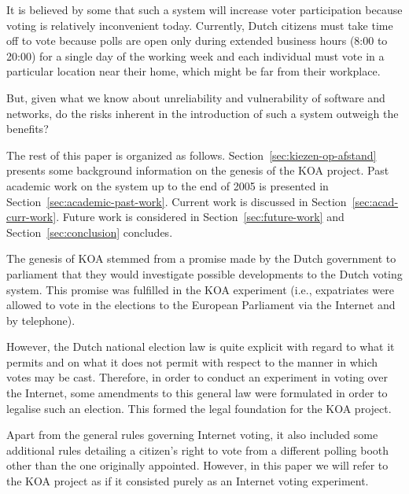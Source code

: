 \documentclass[times, 10pt, twocolumn]{article}
\newcommand{\NL}{the Netherlands\xspace}
\begin{document}
It is believed by some that such a system will increase voter participation 
because voting is relatively inconvenient today. Currently, Dutch citizens must 
take time off to vote because polls are open only during extended business 
hours (8:00 to 20:00) for a single day of the working week and each individual 
must vote in a particular location near their home, which might be far from 
their workplace.

But, given what we know about unreliability and vulnerability of software and 
networks, do the risks inherent in the introduction of such a system outweigh 
the benefits?


The rest of this paper is organized as follows. 
Section~\ref{sec:kiezen-op-afstand} presents some background information on the 
genesis of the KOA project. Past academic work on the system up to the end of 
2005 is presented in Section~\ref{sec:academic-past-work}. Current work is 
discussed in Section~\ref{sec:acad-curr-work}. Future work is considered in 
Section~\ref{sec:future-work} and Section~\ref{sec:conclusion} concludes.


\label{sec:kiezen-op-afstand}

The genesis of KOA stemmed from a promise made by the Dutch government to 
parliament that they would investigate possible developments to the Dutch 
voting system. This promise was fulfilled in the KOA experiment (i.e., 
expatriates were allowed to vote in the elections to the European Parliament 
via the Internet and by telephone).

However, the Dutch national election law is quite explicit with regard to what
it 
permits and on what it does not permit with respect to the manner in which votes may
be cast. Therefore, in order to conduct an experiment in voting over the
Internet, some 
amendments to this general law were formulated in order to legalise such an 
election. This formed the legal foundation for the KOA project. 

Apart from the general rules governing Internet voting, it also included some 
additional rules detailing a citizen's right to vote from a different polling 
booth other than the one originally appointed. However, in this paper we will 
refer to the KOA project as if it consisted purely as an Internet 
voting experiment.

\SubSection{Internet Voting in \NL}
\end{document}
